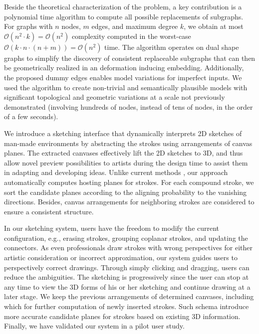 Beside the theoretical characterization of the problem, a key contribution is a polynomial time algorithm to compute all possible replacements of subgraphs. For graphs with $n$ nodes, $m$ edges, and maximum degree $k$, we obtain at most $\mathcal{O}(n^2 \cdot k) = \mathcal{O}(n^2)$ complexity computed in the worst-case $\mathcal{O}(k \cdot n \cdot (n+m)) = \mathcal{O}(n^2)$ time. The algorithm operates on dual shape graphs to simplify the discovery of consistent replaceable subgraphs that can then be geometrically realized in an deformation inducing embedding. Additionally, the proposed dummy edges enables model variations for imperfect inputs. We used the algorithm to create non-trivial and semantically plausible models with significant topological and geometric variations at a scale not previously demonstrated (involving hundreds of nodes, instead of tens of nodes, in the order of a few seconds).

%
We introduce a sketching interface that dynamically interprets 2D sketches of man-made environments by abstracting the strokes using arrangements of canvas planes. The extracted canvases effectively lift the 2D sketches to 3D, and thus allow novel preview possibilities to artists during the design time to assist them in adapting and developing ideas. Unlike current methods \cite{ilovesketch08, Insitu:SIGA11}, our approach automatically computes hosting planes for strokes. For each compound stroke, we sort the candidate planes according to the aligning probability to the vanishing directions. Besides, canvas arrangements for neighboring strokes are considered to ensure a consistent structure.

In our sketching system, users have the freedom to modify the current configuration, e.g., erasing strokes, grouping coplanar strokes, and updating the connectors. As even professionals draw strokes with wrong perspectives for either artistic consideration or incorrect approximation, our system guides users to perspectively correct drawings. Through simply clicking and dragging, users can reduce the ambiguities. The sketching is progressively since the user can stop at any time to view the 3D forms of his or her sketching and continue drawing at a later stage. We keep the previous arrangements of determined canvases, including which for further computation of newly inserted strokes. Such schema introduce more accurate candidate planes for strokes based on existing 3D information. Finally, we have validated our system in a pilot user study.


